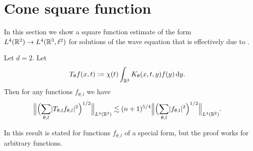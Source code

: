 \section{Cone square function}

In this section we show a square function estimate of the form $L^{4}(\mathbb{R}^{2}) \to L^{4}(\mathbb{R}^{3},\ell^{2})$ for solutions of the wave equation that is effectively due to \cite{MR1173929}.
\begin{lemma}[{\cite[(1.8)]{MR1173929}}]
Let $d=2$.
Let
\[
T_{\theta}f(x,t) := \chi(t) \int_{\mathbb{R}^{2}} K_{\theta}(x,t,y) f(y) \mathop{}\!\mathrm{d} y.
\]
Then for any functions $f_{\theta,l}$ we have
\begin{equation}
\label{eq:R2-to-R3-sq-fct}
\norm[\Big]{ \Bigl( \sum_{\theta,l} \abs{T_{\theta,l}f_{\theta,l}}^{2} \Bigr)^{1/2} }_{L^{4}(\R^{3})}
\lesssim (n+1)^{5/4}
\norm[\Big]{ \Bigl( \sum_{\theta,l} \abs{f_{\theta,l}}^{2} \Bigr)^{1/2} }_{L^{4}(\R^{2})}.
\end{equation}
\end{lemma}
In \cite[(1.8)]{MR1173929} this result is stated for functions $f_{\theta,l}$ of a special form, but the proof works for arbitrary functions.
